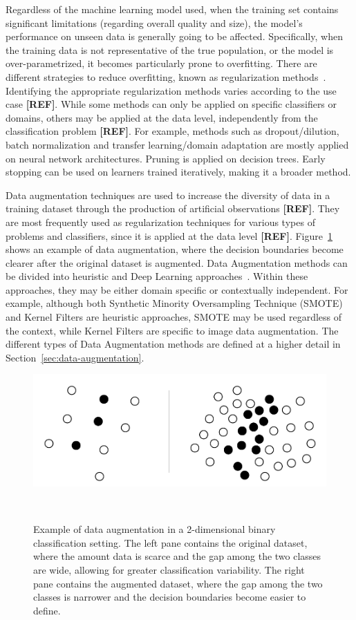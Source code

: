 \documentclass[parskip=full]{scrartcl}
\begin{document}
Regardless of the machine learning model used, when the training set contains
significant limitations (regarding overall quality and size), the model's
performance on unseen data is generally going to be affected. Specifically,
when the training data is not representative of the true population, or the
model is over-parametrized, it becomes particularly prone to overfitting.
There are different strategies to reduce overfitting, known as regularization
methods~\cite{Shorten2019}. Identifying the appropriate regularization methods
varies according to the use case \textbf{[REF]}. While some methods can only
be applied on specific classifiers or domains, others may be applied at the
data level, independently from the classification problem
\textbf{[REF]}. For example, methods such as dropout/dilution, batch
normalization and transfer learning/domain adaptation are mostly applied on
neural network architectures. Pruning is applied on decision trees. Early
stopping can be used on learners trained iteratively, making it a broader
method. 

Data augmentation techniques are used to increase the diversity of data in a
training dataset through the production of artificial observations
\textbf{[REF]}. They are most frequently used as regularization techniques for
various types of problems and classifiers, since it is applied at the data
level \textbf{[REF]}. Figure~\ref{fig:data_augmentation_example} shows an
example of data augmentation, where the decision boundaries become clearer
after the original dataset is augmented. Data Augmentation methods can be
divided into heuristic and Deep Learning approaches~\cite{Shorten2019,
Ratner2017}. Within these approaches, they may be either domain specific or
contextually independent. For example, although both Synthetic Minority
Oversampling Technique (SMOTE)~\cite{Chawla2002} and Kernel Filters are
heuristic approaches, SMOTE may be used regardless of the context, while
Kernel Filters are specific to image data augmentation. The different types of
Data Augmentation methods are defined at a higher detail in
Section~\ref{sec:data-augmentation}.

\begin{figure}[H]
	\centering
	\includegraphics[width=.75\linewidth]{../analysis/data_augmentation_example}
    \caption{Example of data augmentation in a 2-dimensional binary
        classification setting. The left pane contains the original dataset,
        where the amount data is scarce and the gap among the two classes are
        wide, allowing for greater classification variability. The right pane
        contains the augmented dataset, where the gap among the two classes is
        narrower and the decision boundaries become easier to define.
    }~\label{fig:data_augmentation_example}
\end{figure}
\end{document}
